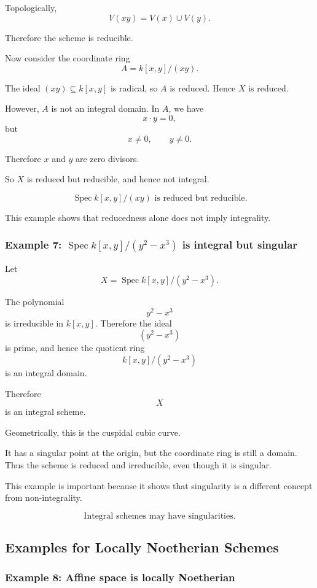 \documentclass[12pt,a4paper]{article}
\DeclareMathOperator{\Spec}{Spec}
\providecommand{\Spec}{\operatorname{Spec}}
\theoremstyle{notespace}
\begin{document}
Topologically,
\[
V(xy)=V(x)\cup V(y).
\]

Therefore the scheme is reducible.

Now consider the coordinate ring
\[
A=k[x,y]/(xy).
\]

The ideal \((xy)\subseteq k[x,y]\) is radical, so \(A\) is reduced. Hence \(X\) is reduced.

However, \(A\) is not an integral domain. In \(A\), we have
\[
x\cdot y=0,
\]
but
\[
x\neq 0,
\qquad
y\neq 0.
\]

Therefore \(x\) and \(y\) are zero divisors.

So \(X\) is reduced but reducible, and hence not integral.

\[
\boxed{
	\Spec k[x,y]/(xy)\text{ is reduced but reducible.}
}
\]

This example shows that reducedness alone does not imply integrality.

\subsubsection*{Example 7: \(\Spec k[x,y]/(y^2-x^3)\) is integral but singular}

Let
\[
X=\Spec k[x,y]/(y^2-x^3).
\]

The polynomial
\[
y^2-x^3
\]
is irreducible in \(k[x,y]\). Therefore the ideal
\[
(y^2-x^3)
\]
is prime, and hence the quotient ring
\[
k[x,y]/(y^2-x^3)
\]
is an integral domain.

Therefore
\[
X
\]
is an integral scheme.

Geometrically, this is the cuspidal cubic curve.

It has a singular point at the origin, but the coordinate ring is still a domain. Thus the scheme is reduced and irreducible, even though it is singular.

This example is important because it shows that singularity is a different concept from non-integrality.

\[
\boxed{
	\text{Integral schemes may have singularities.}
}
\]

\subsection{Examples for Locally Noetherian Schemes}

\subsubsection*{Example 8: Affine space is locally Noetherian}
\end{document}
